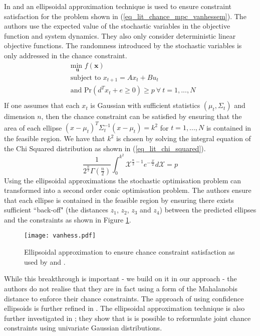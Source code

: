 In \cite{vanhessem2} and \cite{vanhessem1} an ellipsoidal approximation technique is used to ensure constraint satisfaction for the problem shown in (\ref{eq_lit_chance_mpc_vanhessem}). The authors use the expected value of the stochastic variables in the objective function and system dynamics. They also only consider deterministic linear objective functions. The randomness introduced by the stochastic variables is only addressed in the chance constraint. 
\begin{equation}
\begin{aligned}
&\underset{\mathbf{u}}{\text{min }} f(\mathbf{x}) \\
& \text{subject to } x_{t+1}=Ax_t+Bu_t \\
& \text{and } \text{Pr}(d^Tx_t + e \geq 0) \geq p ~\forall ~t=1,...,N\\
\end{aligned}
\label{eq_lit_chance_mpc_vanhessem}
\end{equation}
If one assumes that each $x_t$ is Gaussian with sufficient statistics $(\mu_t, \Sigma_t)$ and dimension $n$, then the chance constraint can be satisfied by ensuring that the area of each ellipse $(x-\mu_t)^T\Sigma_t^{-1}(x-\mu_t)=k^2$ for $t=1,...,N$ is contained in the feasible region. We have that $k^2$ is chosen by solving the integral equation of the Chi Squared distribution as shown in (\ref{eq_lit_chi_squared}).
\begin{equation}
\frac{1}{2^{\frac{n}{2}}\Gamma(\frac{n}{2})}\int_0^{k^2}\mathcal{X}^{\frac{n}{2}-1}e^{-\frac{\mathcal{X}}{2}}d\mathcal{X} = p
\label{eq_lit_chi_squared}
\end{equation} 
Using the ellipsoidal approximations the stochastic optimisation problem can transformed into a second order conic optimisation problem. The authors ensure that each ellipse is contained in the feasible region by ensuring there exists sufficient ``back-off" (the distances $z_1$, $z_2$, $z_3$ and $z_4$) between the predicted ellipses and the constraints as shown in Figure \ref{fig_vanhessem}.
\begin{figure}[H]
\centering
\texttt{[image: vanhess.pdf]}
\caption{Ellipsoidal approximation to ensure chance constraint satisfaction as used by \cite{vanhessem2} and \cite{vanhessem1}.}
\label{fig_vanhessem}
\end{figure}
While this breakthrough is important - we build on it in our approach - the authors do not realise that they are in fact using a form of the Mahalanobis distance to enforce their chance constraints. The approach of using confidence ellipsoids is further refined in \cite{cannon}. The ellipsoidal approximation technique is also further investigated in \cite{blackmore2}; they show that is is possible to reformulate joint chance constraints using univariate Gaussian distributions.

